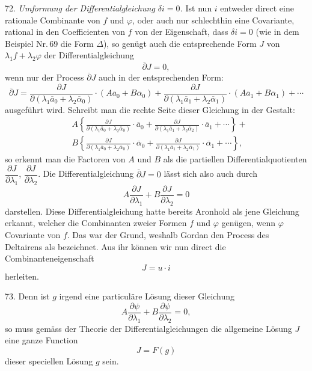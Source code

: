 \documentclass[11pt]{article}
\providecommand{\gesperrt}[1]{\textls[130]{#1}}
\providecommand{\weberpage}[1]{}
\providecommand{\weq}[2]{\begin{equation}\tag{#1}#2\end{equation}}
\begin{document}
\weberpage{77}
72. \textit{Umformung der Differentialgleichung $\delta i=0$.} Ist nun $i$ entweder direct eine rationale Combinante von $f$ und $\varphi$, oder auch nur schlechthin eine Covariante, rational in den Coefficienten von $f$ von der Eigenschaft, dass $\delta i=0$ (wie in dem Beispiel Nr.\,69 die Form $\varDelta$), so genügt auch die entsprechende Form $J$ von $\lambda_1 f+\lambda_2\varphi$ der Differentialgleichung
\[
\overline{\partial} J=0,
\]
wenn nur der Process $\overline{\partial} J$ auch in der entsprechenden Form:
\[
\overline{\partial} J=\frac{\partial J}{\partial(\lambda_1\overline{a}_0+\lambda_2\overline{\alpha}_0)}\cdot(A\overline{a}_0+B\overline{\alpha}_0)+\frac{\partial J}{\partial(\lambda_1\overline{a}_1+\lambda_2\overline{\alpha}_1)}\cdot(A\overline{a}_1+B\overline{\alpha}_1)+\cdots
\]
ausgeführt wird. Schreibt man die rechte Seite dieser Gleichung in der Gestalt:
\[
\begin{aligned}
&A\left\{\frac{\partial J}{\partial(\lambda_1\overline{a}_0+\lambda_2\overline{\alpha}_0)}\cdot\overline{a}_0+\frac{\partial J}{\partial(\lambda_1\overline{a}_1+\lambda_2\overline{\alpha}_2)}\cdot\overline{a}_1+\cdots\right\}+\\
&B\left\{\frac{\partial J}{\partial(\lambda_1\overline{a}_0+\lambda_2\overline{\alpha}_0)}\cdot\overline{\alpha}_0+\frac{\partial J}{\partial(\lambda_1\overline{a}_1+\lambda_2\overline{\alpha}_1)}\cdot\overline{\alpha}_1+\cdots\right\},
\end{aligned}
\]
so erkennt man die Factoren von $A$ und $B$ als die partiellen Differentialquotienten $\dfrac{\partial J}{\partial\lambda_1}$, $\dfrac{\partial J}{\partial\lambda_2}$. Die Differentialgleichung $\overline{\partial} J=0$ lässt sich also auch durch
\weq{II}{A\frac{\partial J}{\partial\lambda_1}+B\frac{\partial J}{\partial\lambda_2}=0}
darstellen. Diese Differentialgleichung hatte bereits Aronhold als jene Gleichung erkannt, welcher die Combinanten zweier Formen $f$ und $\varphi$ genügen, wenn $\varphi$ Covariante von $f$. Das war der Grund, weshalb Gordan den Process des Deltairens als \gesperrt{Aronhold'schen Process} bezeichnet. Aus ihr können wir nun direct die Combinanteneigenschaft
\[
J=u\cdot i
\]
herleiten.

73. Denn ist $g$ irgend eine particuläre Lösung dieser Gleichung
\[
A\frac{\partial\psi}{\partial\lambda_1}+B\frac{\partial\psi}{\partial\lambda_2}=0,
\]
so muss gemäss der Theorie der Differentialgleichungen die allgemeine Lösung $J$ eine ganze Function
\[
J=F(g)
\]
dieser speciellen Lösung $g$ sein.
\end{document}
